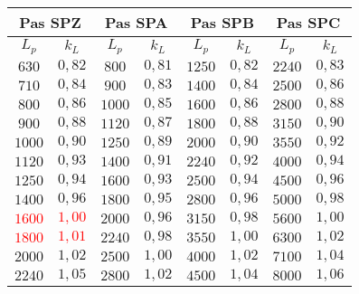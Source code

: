 \begin{table}[]\tiny
\begin{tabular}{|c|c|c|c|c|c|c|c|}
\hline
\multicolumn{2}{|c|}{\textbf{Pas SPZ}} & \multicolumn{2}{c|}{\textbf{Pas SPA}} & \multicolumn{2}{c|}{\textbf{Pas SPB}} & \multicolumn{2}{c|}{\textbf{Pas SPC}} \\ \hline
$L_p$         & $k_L$         & $L_p$         & $k_L$        & $L_p$         & $k_L$        & $L_p$         & $k_L$        \\ \hline
$630$         & $0,82$        & $800$         & $0,81$       & $1250$        & $0,82$       & $2240$        & $0,83$       \\ \hline
$710$         & $0,84$        & $900$         & $0,83$       & $1400$        & $0,84$       & $2500$        & $0,86$       \\ \hline
$800$         & $0,86$        & $1000$        & $0,85$       & $1600$        & $0,86$       & $2800$        & $0,88$       \\ \hline
$900$         & $0,88$        & $1120$        & $0,87$       & $1800$        & $0,88$       & $3150$        & $0,90$       \\ \hline
$1000$        & $0,90$        & $1250$        & $0,89$       & $2000$        & $0,90$       & $3550$        & $0,92$       \\ \hline
$1120$        & $0,93$        & $1400$        & $0,91$       & $2240$        & $0,92$       & $4000$        & $0,94$       \\ \hline
$1250$        & $0,94$        & $1600$        & $0,93$       & $2500$        & $0,94$       & $4500$        & $0,96$       \\ \hline
$1400$        & $0,96$        & $1800$        & $0,95$       & $2800$        & $0,96$       & $5000$        & $0,98$       \\ \hline
\textcolor{red}{$1600$}       & \textcolor{red}{$1,00$}        & $2000$        & $0,96$       & $3150$        & $0,98$       & $5600$        & $1,00$       \\ \hline
\textcolor{red}{$1800$}        & \textcolor{red}{$1,01$}        & $2240$        & $0,98$       & $3550$        & $1,00$       & $6300$        & $1,02$       \\ \hline
$2000$        & $1,02$        & $2500$        & $1,00$       & $4000$        & $1,02$       & $7100$        & $1,04$       \\ \hline
$2240$        & $1,05$        & $2800$        & $1,02$       & $4500$        & $1,04$       & $8000$        & $1,06$       \\ \hline

\end{tabular}
\end{table}
